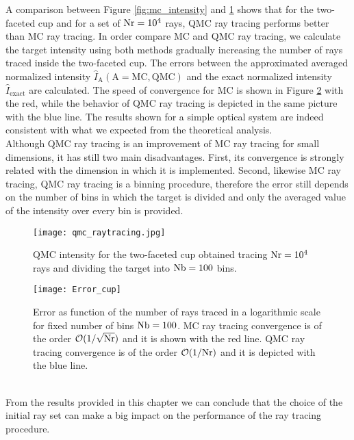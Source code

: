 A comparison between Figure \ref{fig:mc_intensity} and \ref{fig:qmc_intensity} shows that for the two-faceted cup and for a set of $\textrm{Nr}=10^4$ rays, QMC ray tracing performs better than MC ray tracing. In order compare MC and QMC ray tracing, we calculate the target intensity using both methods gradually increasing the number of rays traced inside the two-faceted cup. The errors between the approximated averaged normalized intensity $\hat{I}_{\textrm{A}} (\textrm{A} = \textrm{MC}, \textrm{QMC})$ and the exact normalized intensity $\hat{I}_\textrm{exact}$ are calculated.
The speed of convergence for MC is shown in Figure \ref{fig:Error_cup} with the red, while the behavior of QMC ray tracing is depicted in the same picture with the blue line.
The results shown for a simple optical system are indeed consistent with what we expected from the theoretical analysis.
\\\indent Although QMC ray tracing is an improvement of MC ray tracing for small dimensions, it has still two main disadvantages. 
First, its convergence is strongly related with the dimension in which it is implemented.
Second, likewise MC ray tracing, QMC ray tracing is a binning procedure, therefore the error still depends on the number of bins in which the target is divided and only the averaged value of the intensity over every bin is provided.
\begin{figure}[t]
\begin{center}
    \texttt{[image: qmc\_raytracing.jpg]}
    \caption{QMC intensity for the two-faceted cup obtained tracing $\textrm{Nr}=10^4$ rays and dividing the target into $\textrm{Nb}=100$ bins.}
    \label{fig:qmc_intensity}
\end{center}
  \end{figure}
\begin{figure}[h]
\begin{center}
    \texttt{[image: Error\_cup]}
    \caption{Error as function of the number of rays traced in a logarithmic scale for fixed number of bins $\textrm{Nb}=100$.
 MC ray tracing convergence is of the order $\mathcal{O}(1/\sqrt{\textrm{Nr}})$ and it is shown with the red line. 
QMC ray tracing convergence is of the order $\mathcal{O}(1/\textrm{Nr})$ and it is depicted with the blue line.}
    \label{fig:Error_cup}
\end{center}
  \end{figure}
 \\ \indent
From the results provided in this chapter we can conclude that the choice of the initial ray set can make a big impact on the performance of the ray tracing procedure. 
